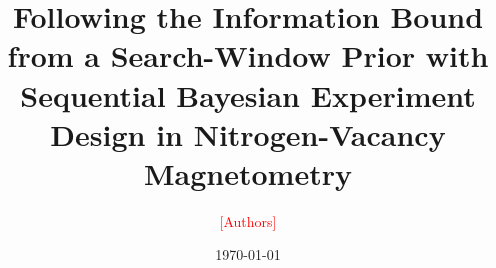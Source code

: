 \documentclass[aps,prapplied,reprint,superscriptaddress,nofootinbib,floatfix]{revtex4-2}
\newcommand{\tbd}[1]{\textcolor{red}{[#1]}}
\begin{document}
\title{Following the Information Bound from a Search-Window Prior with Sequential Bayesian
Experiment Design in Nitrogen-Vacancy Magnetometry}

\author{\tbd{Authors}}
\affiliation{\tbd{Affiliation}}

\date{\today}

\begin{abstract}

\end{abstract}

\maketitle













\appendix




\end{document}

